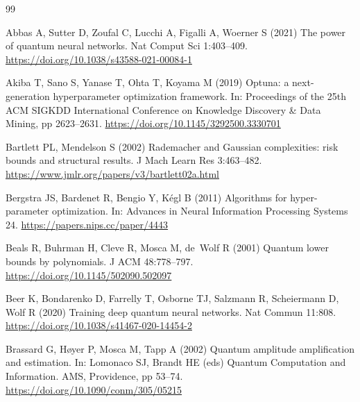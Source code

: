 \documentclass[pdflatex,sn-mathphys,NameDate,iicol]{sn-jnl}
\begin{document}
\begin{thebibliography}{99}

Abbas A, Sutter D, Zoufal C, Lucchi A, Figalli A, Woerner S (2021) The power
of quantum neural networks. Nat Comput Sci 1:403--409.
\url{https://doi.org/10.1038/s43588-021-00084-1}

Akiba T, Sano S, Yanase T, Ohta T, Koyama M (2019) Optuna: a next-generation
hyperparameter optimization framework. In: Proceedings of the 25th ACM SIGKDD
International Conference on Knowledge Discovery \& Data Mining, pp 2623--2631.
\url{https://doi.org/10.1145/3292500.3330701}

Bartlett PL, Mendelson S (2002) Rademacher and Gaussian complexities: risk
bounds and structural results. J Mach Learn Res 3:463--482.
\url{https://www.jmlr.org/papers/v3/bartlett02a.html}

Bergstra JS, Bardenet R, Bengio Y, K{\'e}gl B (2011) Algorithms for
hyper-parameter optimization. In: Advances in Neural Information Processing
Systems 24.
\url{https://papers.nips.cc/paper/4443}

Beals R, Buhrman H, Cleve R, Mosca M, de~Wolf R (2001) Quantum lower bounds
by polynomials. J ACM 48:778--797.
\url{https://doi.org/10.1145/502090.502097}

Beer K, Bondarenko D, Farrelly T, Osborne TJ, Salzmann R, Scheiermann D,
Wolf R (2020) Training deep quantum neural networks. Nat Commun 11:808.
\url{https://doi.org/10.1038/s41467-020-14454-2}

Brassard G, H{\o}yer P, Mosca M, Tapp A (2002) Quantum amplitude amplification
and estimation. In: Lomonaco SJ, Brandt HE (eds) Quantum Computation and
Information. AMS, Providence, pp 53--74.
\url{https://doi.org/10.1090/conm/305/05215}


\end{thebibliography}
\end{document}
